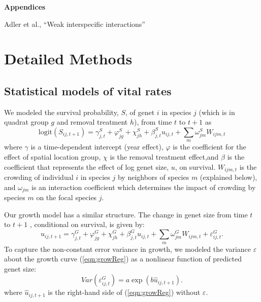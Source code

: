 \documentclass[11pt]{article}
\begin{document}
\clearpage 
\newpage 

\setcounter{page}{1}
\setcounter{equation}{0}
\setcounter{figure}{0}
\setcounter{section}{0}
\setcounter{table}{0}

\centerline{\Large \textbf{Appendices}}
\centerline{Adler et al., ``Weak interspecific interactions''} 

\vspace{0.4in} 

\renewcommand{\theequation}{A-\arabic{equation}}
\renewcommand{\thetable}{A-\arabic{table}}
\renewcommand{\thefigure}{A-\arabic{figure}}
\renewcommand{\thesection}{\Alph{section}}

\section{Detailed Methods} 
\label{AppendixA}

\subsection{Statistical models of vital rates}

We modeled the survival probability, $S$, of genet $i$ in species $j$ (which is in quadrat group $g$ and removal treatment $h$), 
from time $t$ to $t+1$  as
\begin{equation}
\mbox{logit}(S_{ij,t+1}) = \gamma_{j,t}^S + \varphi_{jg}^S+  \chi_{jh}^S  + \beta_{j,t}^S u_{ij,t} +  
\sum \limits_{m} \omega_{jm}^S {W}_{ijm,t}
\label{eqn:survReg}
\end{equation}
where $\gamma$ is a time-dependent intercept (year effect), $\varphi$ is the coefficient for the 
effect of spatial location group, $\chi$ is the removal treatment effect,and  $\beta$ is the coefficient that 
represents the effect of log genet size, $u$, on survival. 
$W_{ijm,t}$ is the crowding of individual $i$ in species $j$ by neighbors of species $m$ (explained below), and 
$\omega_{jm}$ is an interaction coefficient which determines the impact of crowding by species $m$ on the focal species $j$. 

Our growth model has a similar structure. The change in genet size from time $t$ to $t+1$ , conditional on survival, is given by:
\begin{equation}
u_{ij,t+1} = \gamma_{j,t}^G + \varphi_{jg}^G+  \chi_{jh}^G  + \beta_{j,t}^G u_{ij,t} + 
\sum \limits_{m} \omega_{jm}^G {W}_{ijm,t} + \varepsilon_{ij,t}^G .
\label{eqn:growReg}
\end{equation}
To capture the non-constant error variance in growth, we modeled the variance $\varepsilon$ about the growth 
curve (\ref{eqn:growReg}) as a nonlinear function of predicted genet size:
\begin{equation}
Var(\varepsilon_{ij,t}^G) = a \exp(b\hat{u}_{ij,t+1}).
\label{eqn:growVar}
\end{equation}
where $\hat{u}_{ij,t+1}$ is the right-hand side of (\ref{eqn:growReg}) without $\varepsilon$. 
\end{document}
